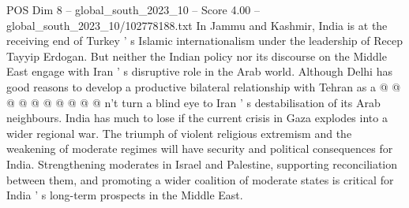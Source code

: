 \begin{textsample}{POS Dim 8 – global\_south\_2023\_10 – Score 4.00 – global\_south\_2023\_10/102778188.txt}
In Jammu and Kashmir, India is at the receiving end of Turkey ' s Islamic internationalism under the leadership of Recep Tayyip Erdogan.
But neither the Indian policy nor its discourse on the Middle East engage with Iran ' s disruptive role in the Arab world.
Although Delhi has good reasons to develop a productive bilateral relationship with Tehran as a @ @ @ @ @ @ @ @ @ @ n't turn a blind eye to Iran ' s destabilisation of its Arab neighbours.
India has much to lose if the current crisis in Gaza explodes into a wider regional war.
The triumph of violent religious extremism and the weakening of moderate regimes will have security and political consequences for India.
Strengthening moderates in Israel and Palestine, supporting reconciliation between them, and promoting a wider coalition of moderate states is critical for India ' s long-term prospects in the Middle East.

\end{textsample}
